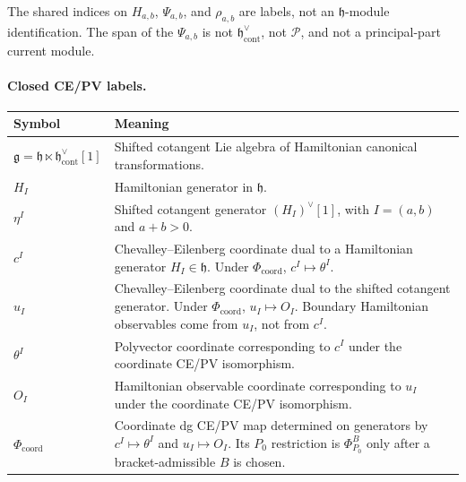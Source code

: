 The shared indices on \(H_{a,b}\), \(\Psi_{a,b}\), and
\(\rho_{a,b}\) are labels, not an \(\mathfrak h\)-module
identification. The span of the \(\Psi_{a,b}\) is not
\(\mathfrak h^\vee_{\mathrm{cont}}\), not \(\mathcal P\), and not a
principal-part current module.

\paragraph{Closed CE/PV labels.}
\begin{center}
\begin{tabular}{@{}>{\raggedright\arraybackslash}p{}
  >{\raggedright\arraybackslash}p{}@{}}
\hline
\textbf{Symbol} & \textbf{Meaning}\\
\hline
\(\mathfrak g=\mathfrak h\ltimes
\mathfrak h^\vee_{\mathrm{cont}}[1]\) &
Shifted cotangent Lie algebra of Hamiltonian canonical transformations.\\
\hline
\(H_I\) &
Hamiltonian generator in \(\mathfrak h\).\\
\hline
\(\eta^I\) &
Shifted cotangent generator \((H_I)^\vee[1]\), with \(I=(a,b)\) and
\(a+b>0\).\\
\hline
\(c^I\) &
Chevalley--Eilenberg coordinate dual to a Hamiltonian generator
\(H_I\in\mathfrak h\). Under \(\Phi_{\mathrm{coord}}\),
\(c^I\mapsto\theta^I\).\\
\hline
\(u_I\) &
Chevalley--Eilenberg coordinate dual to the shifted cotangent generator.
Under \(\Phi_{\mathrm{coord}}\), \(u_I\mapsto O_I\). Boundary Hamiltonian observables
come from \(u_I\), not from \(c^I\).\\
\hline
\(\theta^I\) &
Polyvector coordinate corresponding to \(c^I\) under the coordinate CE/PV
isomorphism.\\
\hline
\(O_I\) &
Hamiltonian observable coordinate corresponding to \(u_I\) under the
coordinate CE/PV isomorphism.\\
\hline
\(\Phi_{\mathrm{coord}}\) &
Coordinate dg CE/PV map determined on generators by
\(c^I\mapsto\theta^I\) and \(u_I\mapsto O_I\).  Its \(P_0\) restriction
is \(\Phi^B_{P_0}\) only after a bracket-admissible \(B\) is chosen.\\
\hline
\end{tabular}
\end{center}

